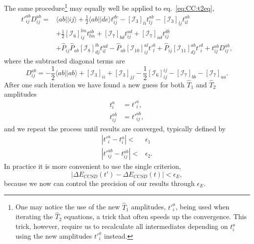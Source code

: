 The same procedure\footnote{One may notice the use of the new $\hat{T}_1$ amplitudes, $\left. t' \right._i^a$, being used when iterating the $\hat{T}_2$ equations, a trick that often speeds up the convergence. This trick, however, require us to recalculate all intermediates depending on $t_i^a$ using the new amplitudes $\left. t' \right._i^a$ instead.} may equally well be applied to eq.~\eqref{eq:CC:t2eq},
\begin{equation}
\label{eq:CC:t2_iteration}
\begin{split}
\left. t' \right._{ij}^{ab} D_{ij}^{ab}
=&
\langle ab || ij \rangle
+ \frac{1}{2} \langle ab||de \rangle t_{ij}^{de}
-  \left[\mathcal{I}_3\right]_{li} t_{lj}^{ab}
-  \left[\mathcal{I}_3\right]_{lj} t_{il}^{ab}
\\
&
+  \frac{1}{2} \left[\mathcal{I}_6\right]_{ij}^{lm}  t_{lm}^{ab}
+  \left[\mathcal{I}_7\right]_{bd} t_{ij}^{ad} 
+ \left[\mathcal{I}_7\right]_{ad} t_{ij}^{db} 
\\
&
+\hat{P}_{ij} \hat{P}_{ab} \left[\mathcal{I}_8\right]_{dj}^{lb} t_{il}^{ad}
-\hat{P}_{ab} \left[\mathcal{I}_{10}\right]_{ij}^{al} \left. t'\right._l^b
+ \hat{P}_{ij} \left[\mathcal{I}_{11}\right]_{dj}^{ab} \left. t'\right._i^d + t_{ij}^{ab} D_{ij}^{ab},
\end{split}
\end{equation}
where the subtracted diagonal terms are
\begin{equation}
D_{ij}^{ab} 
= 
- \frac{1}{2} \langle ab||ab \rangle
+ \left[\mathcal{I}_3\right]_{ii}  
+ \left[\mathcal{I}_3\right]_{jj} 
- \frac{1}{2} \left[\mathcal{I}_6\right]_{ij}^{ij} 
- \left[\mathcal{I}_7\right]_{bb}
- \left[\mathcal{I}_7\right]_{aa}.
\end{equation}
After one such iteration we have found a new guess for both $\hat{T}_1$ and $\hat{T}_2$ amplitudes 
\begin{equation}
\begin{split}
t_i^a &= \left. t'\right._i^a , \\
t_{ij}^{ab} &= \left. t' \right._{ij}^{ab} ,
\end{split}
\end{equation}
and we repeat the process until results are converged, typically defined by 
\begin{equation}
\begin{split}
|\left. t' \right._i^a - t_i^a| <& \epsilon_1 \\
|\left. t' \right._{ij}^{ab} - t_{ij}^{ab} | <& \epsilon_2   .
\end{split}
\end{equation} 
In practice it is more convenient to use the single criterion,
\begin{equation}
\label{eq:CC:convergence}
|\Delta E_{CCSD}(t') - \Delta E_{CCSD}(t)| < \epsilon_E ,
\end{equation}
because we now can control the precision of our results through $\epsilon_E$.



